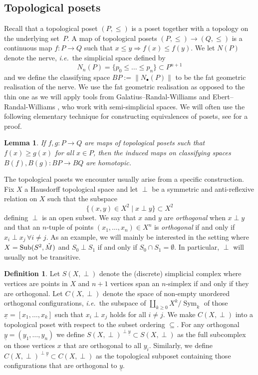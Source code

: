 \documentclass{amsart}
\theoremstyle{plain}
\newtheorem{lem}[thm]{Lemma}
\theoremstyle{definition}
\newtheorem{defn}[thm]{Definition}
\DeclareMathOperator{\umb}{Sub} %
\newcommand{\interior}[1]{\smash{\mathring{#1}}}
\DeclareMathOperator{\Sym}{Sym}
\renewcommand{\ul}[1]{\underline{#1}}
\begin{document}
\subsection{Topological posets}\label{section - discretization}

Recall that a topological poset $(P, \leq)$ is a poset together with a topology on the underlying set~$P$.
A map of topological posets $(P, \leq) \to (Q,\leq)$ is a continuous map $f\colon P \to Q$ such that $x \le y \Rightarrow f(x) \le f(y)$.
We let $N(P)$ denote the nerve, \emph{i.e.}~the simplicial space defined by 
    \[
        N_n(P) = \{p_0 \le \dots \le p_n\} \subset P^{n+1}
    \]
and we define the classifying space $BP := \|N_\bullet(P)\|$ to be the fat geometric realisation of the nerve.
We use the fat geometric realisation as opposed to the thin one as we will apply tools from Galatius--Randal-Williams \cite{GalatiusRandalWilliams} and Ebert--Randal-Williams \cite{EbertRandalWilliams}, who work with semi-simplicial spaces.
We will often use the following elementary technique for constructing equivalences of posets, see \cite[Lemma 3.4]{EbertRandalWilliams} for a proof.

\begin{lem}\label{lem:poset-natural-transformation=homotopy}
    If $f,g: P \to Q$ are maps of topological posets such that $f(x) \ge g(x)$ for all $x \in P$, then the induced maps on classifying spaces 
    $B(f), B(g): BP \to BQ$
    are homotopic.
\end{lem}

The topological posets we encounter usually arise from a specific construction.
Fix $X$ a Hausdorff topological space and let $\perp$ be a symmetric and anti-reflexive relation on $X$ such that the subspace
\[
    \{(x,y) \in X^2 \mid x \perp y\} \subset X^2
\]
defining $\perp$ is an open subset.
%
We say that $x$ and $y$ are \emph{orthogonal} when $x \perp y$ and  that an $n$-tuple of points $(x_1, \dots, x_n) \in X^n$ is \emph{orthogonal} if and only if $x_i \perp x_j \,\forall i\neq j$.
As an example, we will mainly be interested in the setting where $X = \umb(S^2, \interior{M})$ and $S_0 \perp S_1$ if and only if $S_0 \cap S_1 = \emptyset$.
In particular, $\perp$ will usually not be transitive.

\begin{defn}\label{defn - C/S(X, perp)}
    Let $S(X, \perp)$ denote the (discrete) simplicial complex where vertices are points in $X$ and $n+1$ vertices span an $n$-simplex if and only if they are orthogonal.
    Let $C(X, \perp)$ denote the space of non-empty unordered orthogonal configurations, 
    \emph{i.e.}~the subspace of $\coprod_{k\ge 0} X^k/\Sym_k$ of those $\ul{x} = [x_1,\dots,x_k]$ such that $x_i \perp x_j$ holds for all $i \neq j$.
    We make $C(X, \perp)$ into a topological poset with respect to the subset ordering $\subseteq$.
    For any orthogonal $\ul{y} = (y_1,\dots,y_n)$ we define $S(X, \perp)^{\perp \ul{y}} \subset S(X, \perp)$ as the full subcomplex on those vertices $x$ that are orthogonal to all $y_i$.
    Similarly, we define $C(X, \perp)^{\perp \ul{y}} \subset C(X,\perp)$ as the topological subposet containing those configurations that are orthogonal to $\ul{y}$. 
\end{defn}
\end{document}
